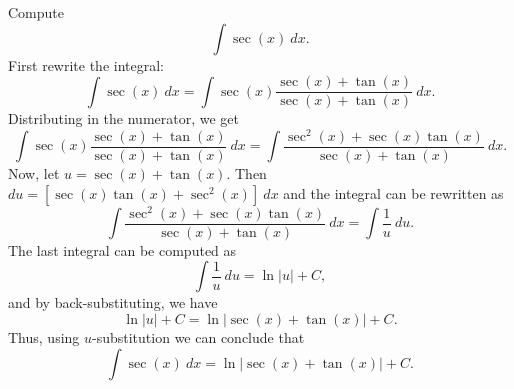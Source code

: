 \documentclass[handout]{ximera}
\begin{document}
\begin{example}[example 16] Compute 
\[\int \sec(x) \ dx.\]
First rewrite the integral:
\[\int \sec(x) \ dx =\int \sec(x)\frac{\sec(x)+\tan(x)}{\sec(x)+\tan(x)} \ dx.\]
Distributing in the numerator, we get
\[\int \sec(x)\frac{\sec(x)+\tan(x)}{\sec(x)+\tan(x)} \ dx = \int \frac{\sec^2(x)+\sec(x)\tan(x)}{\sec(x)+\tan(x)} \ dx.\]
Now, let $u = \sec(x) + \tan(x)$. Then $du = [\sec(x)\tan(x) + \sec^2(x)] \ dx$ and the integral can be rewritten as
\[ \int \frac{\sec^2(x)+\sec(x)\tan(x)}{\sec(x)+\tan(x)} \ dx = \int \frac{1}{u} \ du.\]
The last integral can be computed as
\[\int \frac{1}{u} \ du = \ln|u| + C,\]
and by back-substituting, we have 
\[\ln|u| + C = \ln|\sec(x) + \tan(x)| + C.\]
Thus, using $u$-substitution we can conclude that
\[\int \sec(x) \ dx =  \ln|\sec(x) + \tan(x)| + C.\]
\end{example}


\begin{center}
\begin{foldable}
\end{foldable}
\end{center}
\end{document}
